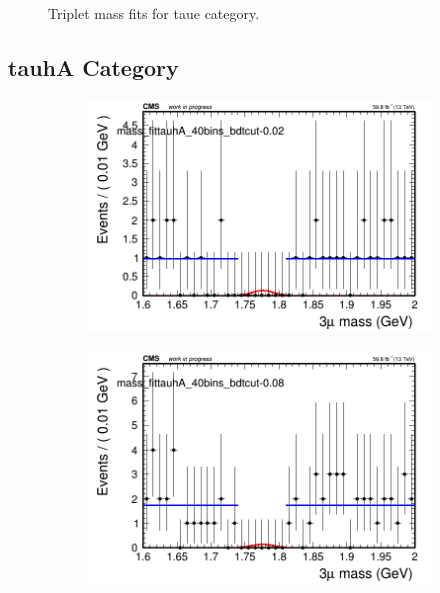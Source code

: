 \begin{figure}[H]
\begin{subfigure}{0.2\textwidth}
        \caption{}
    \end{subfigure}
    \caption{Triplet mass fits for taue category.}
    \label{fig:flatfittaue}
\end{figure}

\subsection{tauhA Category}
\label{sec:flatfittauhA}

\begin{figure}[H]
    \centering
    \begin{subfigure}{0.2\textwidth}
        \includegraphics[width=\textwidth]{flat_fit/plots/tauhA/massfit_tauhA_40bins_bdtcut-0.02.png}
        \caption{}
    \end{subfigure}
    \begin{subfigure}{0.2\textwidth}
        \includegraphics[width=\textwidth]{flat_fit/plots/tauhA/massfit_tauhA_40bins_bdtcut-0.08.png}

\end{subfigure}
\end{figure}
